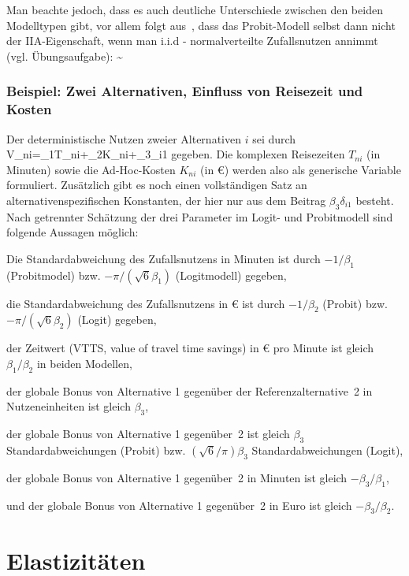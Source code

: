 Man beachte jedoch, dass es auch deutliche Unterschiede zwischen den
beiden Modelltypen gibt, vor allem folgt aus~, dass 
 das Probit-Modell selbst
dann nicht der IIA-Eigenschaft, wenn man i.i.d - normalverteilte
Zufallsnutzen annimmt (vgl. \"Ubungsaufgabe):
\bdm
\epsilon \sim {} \ \nRightarrow \ 
\edm


\subsubsection*{Beispiel: Zwei Alternativen, Einfluss von Reisezeit und Kosten}
%
Der deterministische Nutzen zweier Alternativen $i$ sei durch
\bdm
V_{ni}=\beta_1T_{ni}+\beta_2K_{ni}+\beta_3\delta_{i1}
\edm
gegeben.  Die komplexen Reisezeiten $T_{ni}$ (in Minuten)  sowie
die Ad-Hoc-Kosten $K_{ni}$ (in \euro{}) werden also als generische
Variable formuliert. Zus\"atzlich gibt es noch einen vollst\"andigen
Satz an alternativenspezifischen Konstanten, der hier nur aus dem
Beitrag $\beta_3\delta_{i1}$ besteht. Nach getrennter Sch\"atzung der drei
Parameter im Logit- und Probitmodell sind folgende Aussagen m\"oglich:
\bi
\item Die Standardabweichung des Zufallsnutzens in
  Minuten ist durch $-1/\beta_1$ (Probitmodel)
  bzw. $-\pi/(\sqrt{6}\beta_1)$ (Logitmodell) gegeben,
\item die Standardabweichung des Zufallsnutzens in
  \euro{} ist durch $-1/\beta_2$ (Probit)
  bzw. $-\pi/(\sqrt{6}\beta_2)$ (Logit) gegeben,
\item der Zeitwert (VTTS, value of travel time savings) in \euro{} pro Minute ist gleich 
$\beta_1/\beta_2$ in beiden Modellen,
\item der globale Bonus von Alternative 1 gegen\"uber der Referenzalternative~2 in
  Nutzeneinheiten ist gleich $\beta_3$,
\item der globale Bonus von Alternative 1 gegen\"uber~2 ist gleich
  $\beta_3$ Standardabweichungen (Probit) bzw. $(\sqrt{6}/\pi)
  \beta_3$  Standardabweichungen  (Logit),
\item der globale Bonus von Alternative 1 gegen\"uber~2 in Minuten ist
  gleich $-\beta_3/\beta_1$,
\item und der globale Bonus von Alternative 1 gegen\"uber~2 in Euro
  ist gleich $-\beta_3/\beta_2$.
\ei

 
\section{\label{sec:discrElast}Elastizit\"aten}

